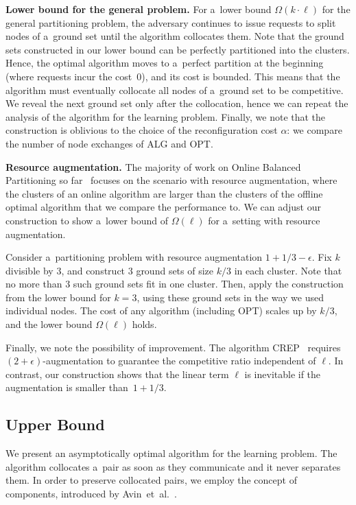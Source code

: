 \documentclass[a4paper,anonymous,USenglish]{lipics-v2019}
\newcommand{\OPT}{\textsc{OPT}\xspace}
\newcommand{\ALG}{\textsc{ALG}\xspace}
\begin{document}
\noindent
\textbf{Lower bound for the general problem.}
For a~lower bound $\Omega(k\cdot \ell)$ for the general partitioning problem, the adversary continues to issue requests to split nodes of a~ground set until the algorithm collocates them.
Note that the ground sets constructed in our lower bound can be perfectly partitioned into the clusters.
Hence, the optimal algorithm moves to a~perfect partition at the beginning (where requests incur the cost~$0$), and its cost is bounded.
This means that the algorithm must eventually collocate all nodes of a~ground set to be competitive.
We reveal the next ground set only after the collocation, hence we can repeat the analysis of the algorithm for the learning problem.
Finally, we note that the construction is oblivious to the choice of the reconfiguration cost $\alpha$: we compare the 	number of node exchanges of \ALG and \OPT.

\medskip

\noindent
\textbf{Resource augmentation.}
The majority of work on Online Balanced Partitioning so far~\cite{repartition-disc,sigmetrics19_partitioning} focuses on the scenario with resource augmentation, where the clusters of an online algorithm are larger than the clusters of the offline optimal algorithm that we compare the performance to.
We can adjust our construction to show a~lower bound of $\Omega(\ell)$ for a~setting with resource augmentation.

Consider a~partitioning problem with resource augmentation $1+1/3-\epsilon$.
Fix $k$ divisible by $3$, and construct $3$ ground sets of size $k/3$ in each cluster.
Note that no more than $3$ such ground sets fit in one cluster.
Then, apply the construction from the lower bound for $k=3$, using these ground sets in the way we used individual nodes.
The cost of any algorithm (including \OPT) scales up by $k/3$, and the lower bound $\Omega(\ell)$ holds.

Finally, we note the possibility of improvement. The algorithm CREP~\cite{repartition-disc} requires $(2+\epsilon)$-augmentation to guarantee the competitive ratio independent of $\ell$.
In contrast, our construction shows that the linear term $\ell$ is inevitable if the augmentation is smaller than~$1+1/3$.

\subsection{Upper Bound}
\label{sec:ppl}

We present an asymptotically optimal algorithm for the learning problem.
The algorithm  collocates  a~pair as soon as they communicate and it never separates them.
In order to preserve collocated pairs,
we employ the concept of components,
introduced by Avin~et~al.~\cite{repartition-disc}.
\end{document}
